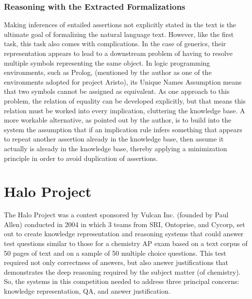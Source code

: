 \subsubsection{Reasoning with the Extracted Formalizations}

Making inferences of entailed assertions not explicitly stated in the text is the ultimate goal of formalizing the natural language text.  However, like the first task, this task also comes with complications.  In the case of generics, their representation appears to lead to a downstream problem of having to resolve multiple symbols representing the same object.  In logic programming environments, such as Prolog, \cite{blackburn_2006_prolog_ch1,blackburn_2006_prolog_ch2,blackburn_2006_prolog_ch3,blackburn_2006_prolog_ch4,blackburn_2006_prolog_ch5,blackburn_2006_prolog_ch6} (mentioned by the author as one of the environments adopted for project Aristo), its Unique Names Assumption means that two symbols cannot be assigned as equivalent.  As one approach to this problem, the relation of equality can be developed explicitly, but that means this relation must be worked into every implication, cluttering the knowledge base.  A more workable alternative, as pointed out by the author, is to build into the system the assumption that if an implication rule infers something that appears to repeat another assertion already in the knowledge base, then assume it actually is already in the knowledge base, thereby applying a minimization principle in order to avoid duplication of assertions.


\section{Halo Project}

The Halo Project \cite{friedland2004project} was a contest sponsored by Vulcan Inc. (founded by Paul Allen) conducted in 2004 in which 3 teams from SRI, Ontoprise, and Cycorp, set out to create knowledge representation and reasoning systems that could answer test questions similar to those for a chemistry AP exam based on a text corpus of 50 pages of text and on a sample of 50 multiple choice questions.  This test required not only correctness of answers, but also answer justifications that demonstrates the deep reasoning required by the subject matter (of chemistry).  So, the systems in this competition needed to address three principal concerns:  knowledge representation, QA, and answer justification. 


